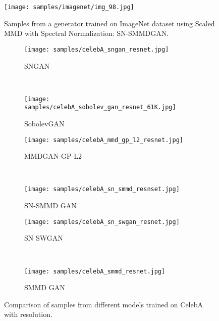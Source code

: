 \documentclass{article}
\begin{document}
\begin{figure}
        \centering
        \texttt{[image: samples/imagenet/img\_98.jpg]}
        \caption{Samples from a generator trained on ImageNet dataset using Scaled MMD with Spectral Normalization: SN-SMMDGAN.  }
       \label{fig:imagenet_additional}
\end{figure}

\begin{figure}[ht!]
    \centering
    \begin{subfigure}[t]{0.48\textwidth}
        \centering
        \texttt{[image: samples/celebA\_sngan\_resnet.jpg]}
        \caption{SNGAN} \label{fig:celebA_sngan:samples}
    \end{subfigure}
    ~
    \begin{subfigure}[t]{0.48\textwidth}
        \centering
        \texttt{[image: samples/celebA\_sobolev\_gan\_resnet\_61K.jpg]}
        \caption{SobolevGAN} \label{fig:celebA_sobolev_gan:samples}
    \end{subfigure}
   \vspace{0cm}
    \begin{subfigure}[t]{0.48\textwidth}
        \centering
        \texttt{[image: samples/celebA\_mmd\_gp\_l2\_resnet.jpg]}
        \caption{MMDGAN-GP-L2} \label{fig:celebA_mmd_gp_l:samples}
    \end{subfigure}
    ~
    \begin{subfigure}[t]{0.48\textwidth}
        \centering
        \texttt{[image: samples/celebA\_sn\_smmd\_resnset.jpg]}
        \caption{SN-SMMD GAN} \label{fig:celebA_sn_smmd:samples}
    \end{subfigure}
     \vspace{0cm}
    \begin{subfigure}[t]{0.48\textwidth}
        \centering
        \texttt{[image: samples/celebA\_sn\_swgan\_resnet.jpg]}
        \caption{SN SWGAN} \label{fig:celebA_sn_swgan:samples}
    \end{subfigure}
    ~
    \begin{subfigure}[t]{0.48\textwidth}
        \centering
        \texttt{[image: samples/celebA\_smmd\_resnet.jpg]}
        \caption{SMMD GAN} \label{fig:celebA_smmd:samples}
    \end{subfigure}
    \caption{Comparison of samples from different models trained on CelebA with  resolution.}
    \label{fig:celebA_samples_additional}
\end{figure}
\end{document}

